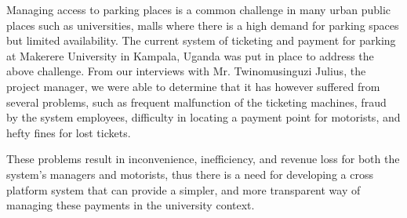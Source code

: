 Managing access to parking places is a common challenge in many urban public places such as universities, malls where there is a high demand for parking spaces but limited availability\cite{parmar_study_2020}.
The current system of ticketing and payment for parking at Makerere University in Kampala, Uganda was put in place to address the above challenge. From our interviews with Mr. Twinomusinguzi Julius, the project manager, we were able to determine that it has however suffered from several problems, such as frequent malfunction of the ticketing machines, fraud by the system employees, difficulty in locating a payment point for motorists, and hefty fines for lost tickets.

These problems result in inconvenience, inefficiency, and revenue loss for both the system’s managers and motorists, thus there is a need for developing a cross platform system that can provide a simpler, and more transparent way of managing these payments in the university context.

